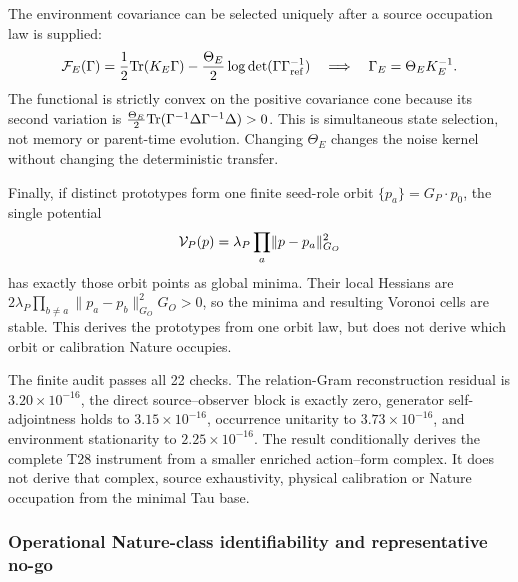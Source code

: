 \documentclass[11pt]{article}
\begin{document}
The environment covariance can be selected uniquely after a source
occupation law is supplied:
\begin{equation}
 {\cal F}_E(\Gamma)
 =\frac12{\rm Tr}(K_E\Gamma)
 -\frac{\Theta_E}{2}
  \log\det(\Gamma\Gamma_{\rm ref}^{-1})
 \quad\Longrightarrow\quad
 \Gamma_E=\Theta_EK_E^{-1}.
 \label{eq:environment-covariance-functional}
\end{equation}
The functional is strictly convex on the positive covariance cone because
its second variation is
\(\frac{\Theta_E}{2}{\rm Tr}
(\Gamma^{-1}\Delta\Gamma^{-1}\Delta)>0\).
This is simultaneous state selection, not memory or parent-time evolution.
Changing \(\Theta_E\) changes the noise kernel without changing the
deterministic transfer.

Finally, if distinct prototypes form one finite seed-role orbit
\(\{p_a\}=G_P\cdot p_0\), the single potential
\begin{equation}
 {\cal V}_P(p)=\lambda_P\prod_a
 \lVert p-p_a\rVert_{G_O}^2
 \label{eq:pointer-orbit-potential}
\end{equation}
has exactly those orbit points as global minima.  Their local Hessians are
\(2\lambda_P\prod_{b\ne a}
\lVert p_a-p_b\rVert_{G_O}^2G_O>0\), so the minima and resulting Voronoi
cells are stable.  This derives the prototypes from one orbit law, but does
not derive which orbit or calibration Nature occupies.

The finite audit passes all 22 checks.  The relation-Gram reconstruction
residual is \(3.20\times10^{-16}\), the direct source--observer block is
exactly zero, generator self-adjointness holds to
\(3.15\times10^{-16}\), occurrence unitarity to
\(3.73\times10^{-16}\), and environment stationarity to
\(2.25\times10^{-16}\).  The result conditionally derives the complete T28
instrument from a smaller enriched action--form complex.  It does not derive
that complex, source exhaustivity, physical calibration or Nature occupation
from the minimal Tau base.

\subsubsection{Operational Nature-class identifiability and representative no-go}
\end{document}
